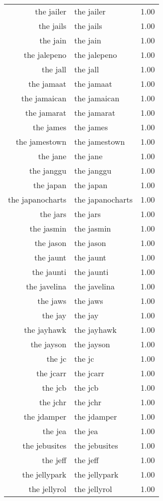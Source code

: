 \begin{table}[ht]
\begin{tabular}{rlr}
  the jailer & the jailer & 1.00 \\ 
  the jails & the jails & 1.00 \\ 
  the jain & the jain & 1.00 \\ 
  the jalepeno & the jalepeno & 1.00 \\ 
  the jall & the jall & 1.00 \\ 
  the jamaat & the jamaat & 1.00 \\ 
  the jamaican & the jamaican & 1.00 \\ 
  the jamarat & the jamarat & 1.00 \\ 
  the james & the james & 1.00 \\ 
  the jamestown & the jamestown & 1.00 \\ 
  the jane & the jane & 1.00 \\ 
  the janggu & the janggu & 1.00 \\ 
  the japan & the japan & 1.00 \\ 
  the japanocharts & the japanocharts & 1.00 \\ 
  the jars & the jars & 1.00 \\ 
  the jasmin & the jasmin & 1.00 \\ 
  the jason & the jason & 1.00 \\ 
  the jaunt & the jaunt & 1.00 \\ 
  the jaunti & the jaunti & 1.00 \\ 
  the javelina & the javelina & 1.00 \\ 
  the jaws & the jaws & 1.00 \\ 
  the jay & the jay & 1.00 \\ 
  the jayhawk & the jayhawk & 1.00 \\ 
  the jayson & the jayson & 1.00 \\ 
  the jc & the jc & 1.00 \\ 
  the jcarr & the jcarr & 1.00 \\ 
  the jcb & the jcb & 1.00 \\ 
  the jchr & the jchr & 1.00 \\ 
  the jdamper & the jdamper & 1.00 \\ 
  the jea & the jea & 1.00 \\ 
  the jebusites & the jebusites & 1.00 \\ 
  the jeff & the jeff & 1.00 \\ 
  the jellypark & the jellypark & 1.00 \\ 
  the jellyrol & the jellyrol & 1.00 \\ 

\end{tabular}
\end{table}
